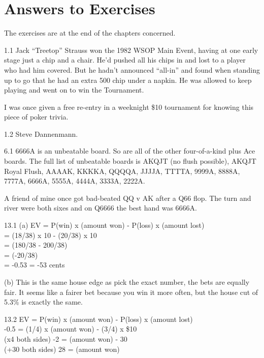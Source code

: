 \chapter{Answers to Exercises}

The exercises are at the end of the chapters concerned.


1.1 Jack ``Treetop'' Strauss won the 1982 WSOP Main Event,
having at one early stage just a chip and a chair. He'd
pushed all his chips in and lost to a player who had him
covered. But he hadn't announced ``all-in'' and found when standing up
to go that he had an extra 500 chip under a napkin. He was allowed to
keep playing and went on to win the Tournament.

I was once given a free re-entry in a weeknight \$10 tournament for
knowing this piece of poker trivia.

1.2 Steve Dannenmann.

6.1 6666A is an unbeatable board. So are all of the other
four-of-a-kind plus Ace boards. The full list of unbeatable boards is
AKQJT (no flush possible), AKQJT Royal Flush, AAAAK, KKKKA, QQQQA,
JJJJA, TTTTA, 9999A, 8888A, 7777A, 6666A, 5555A, 4444A, 3333A, 2222A.

A friend of mine once got bad-beated QQ v AK after a Q66 flop. The
turn and river were both sixes and on Q6666 the best hand was 6666A.

13.1 (a) EV = P(win) x (amount won) - P(loss) x (amount lost) \\
= (18/38) x 10 - (20/38) x 10 \\
= (180/38 - 200/38) \\
= (-20/38) \\
= -0.53 = -53 cents

(b) This is the same house edge as pick the exact number, the bets are
equally fair. It seems like a fairer bet because you win it more
often, but the house cut of 5.3\% is exactly the same.

13.2 EV = P(win) x (amount won) - P(loss) x (amount lost) \\
-0.5  = (1/4)  x (amount won) - (3/4) x \$10 \\
(x4 both sides) -2 = (amount won) - 30 \\
(+30 both sides) 28 = (amount won) \\

